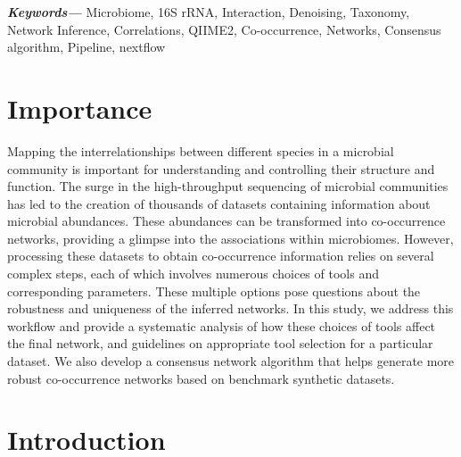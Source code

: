 \documentclass[letterpaper,12pt]{article}
\providecommand{\keywords}[1]{\textbf{\textit{Keywords---}} #1}
\begin{document}
\keywords{Microbiome, 16S rRNA, Interaction, Denoising, Taxonomy, Network Inference, Correlations, QIIME2, Co-occurrence, Networks, Consensus algorithm, Pipeline, nextflow}


\section*{Importance}
  Mapping the interrelationships between different species in a microbial community is important for understanding and controlling their structure and function.
  The surge in the high-throughput sequencing of microbial communities has led to the creation of thousands of datasets containing information about microbial abundances.
  These abundances can be transformed into co-occurrence networks, providing a glimpse into the associations within microbiomes.
  However, processing these datasets to obtain co-occurrence information relies on several complex steps, each of which involves numerous choices of tools and corresponding parameters.
  These multiple options pose questions about the robustness and uniqueness of the inferred networks.
  In this study, we address this workflow and provide a systematic analysis of how these choices of tools affect the final network, and guidelines on appropriate tool selection for a particular dataset.
  We also develop a consensus network algorithm that helps generate more robust co-occurrence networks based on benchmark synthetic datasets.

\doublespacing

\section*{Introduction}
\end{document}
